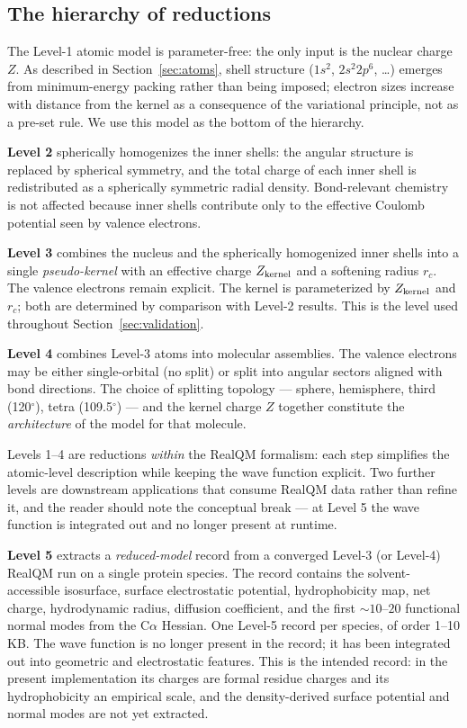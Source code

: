 \documentclass[11pt]{article}
\begin{document}
\subsection{The hierarchy of reductions}

The Level-1 atomic model is parameter-free: the only input is the nuclear charge $Z$. As described in Section~\ref{sec:atoms}, shell structure ($1s^2$, $2s^2 2p^6$, \ldots) emerges from minimum-energy packing rather than being imposed; electron sizes increase with distance from the kernel as a consequence of the variational principle, not as a pre-set rule. We use this model as the bottom of the hierarchy.

\textbf{Level 2} spherically homogenizes the inner shells: the angular structure is replaced by spherical symmetry, and the total charge of each inner shell is redistributed as a spherically symmetric radial density. Bond-relevant chemistry is not affected because inner shells contribute only to the effective Coulomb potential seen by valence electrons.

\textbf{Level 3} combines the nucleus and the spherically homogenized inner shells into a single \emph{pseudo-kernel} with an effective charge $Z_{\rm kernel}$ and a softening radius $r_c$. The valence electrons remain explicit. The kernel is parameterized by $Z_{\rm kernel}$ and $r_c$; both are determined by comparison with Level-2 results. This is the level used throughout Section~\ref{sec:validation}.

\textbf{Level 4} combines Level-3 atoms into molecular assemblies. The valence electrons may be either single-orbital (no split) or split into angular sectors aligned with bond directions. The choice of splitting topology --- sphere, hemisphere, third (120$^\circ$), tetra (109.5$^\circ$) --- and the kernel charge $Z$ together constitute the \emph{architecture} of the model for that molecule.

Levels 1--4 are reductions \emph{within} the RealQM formalism: each step simplifies the atomic-level description while keeping the wave function explicit. Two further levels are downstream applications that consume RealQM data rather than refine it, and the reader should note the conceptual break --- at Level 5 the wave function is integrated out and no longer present at runtime.

\textbf{Level 5} extracts a \emph{reduced-model} record from a converged Level-3 (or Level-4) RealQM run on a single protein species. The record contains the solvent-accessible isosurface, surface electrostatic potential, hydrophobicity map, net charge, hydrodynamic radius, diffusion coefficient, and the first $\sim 10$--$20$ functional normal modes from the C$\alpha$ Hessian. One Level-5 record per species, of order 1--10 KB. The wave function is no longer present in the record; it has been integrated out into geometric and electrostatic features. This is the intended record: in the present implementation its charges are formal residue charges and its hydrophobicity an empirical scale, and the density-derived surface potential and normal modes are not yet extracted.
\end{document}

